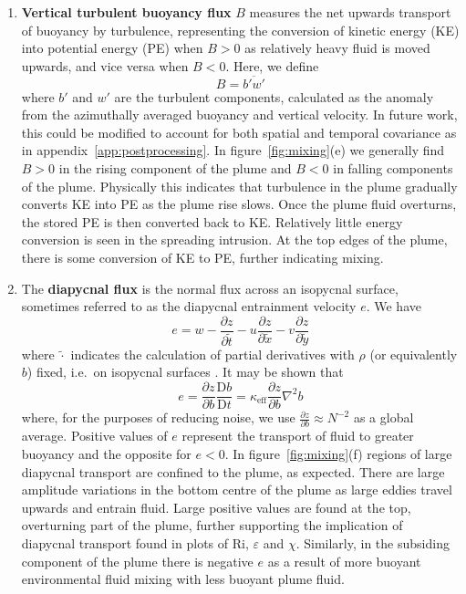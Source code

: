 \documentclass[a4paper]{article}
\begin{document}
\begin{enumerate}[label=(\alph*)]
	\item \textbf{Vertical turbulent buoyancy flux} $B$ measures the net upwards transport of buoyancy by
		turbulence, representing the conversion of kinetic energy (KE) into potential energy (PE) when $B > 0$
		as relatively heavy fluid is moved upwards, and vice versa when $B<0$. Here, we define
		\begin{equation}
			B = \overline{b'w'}
		\end{equation}
		where $b'$ and $w'$ are the turbulent components, calculated as the anomaly from the 
		azimuthally averaged buoyancy and vertical velocity. In future work, this could be modified to account
		for both spatial and temporal covariance as in appendix~\ref{app:postprocessing}. In
		figure~\ref{fig:mixing}(e) we generally find $B > 0$ in the rising component of the plume and $B < 0$ in
		falling components of the plume. Physically this indicates that turbulence in the plume gradually
		converts KE into PE as the plume rise slows.  Once the plume fluid overturns, the stored PE is then
		converted back to KE.  Relatively little energy conversion is seen in the spreading intrusion. At the
		top edges of the plume, there is some conversion of KE to PE, further indicating mixing.

	\item The \textbf{diapycnal flux} is the normal flux across an isopycnal surface, sometimes referred to as
		the diapycnal entrainment velocity $e$. We have
		\begin{equation}
			e = w - \frac{\partial z}{\partial \tilde{t}} - u\frac{\partial z}{\partial\tilde{x}} -
			v\frac{\partial z}{\partial\tilde{y}}
		\end{equation}
		where $\tilde{\cdot}$ indicates the calculation of partial derivatives with $\rho$ (or equivalently $b$)
		fixed, i.e.\ on isopycnal surfaces \citep{deszoeke1993}. It may be shown that
		\begin{equation}
			e = \frac{\partial z}{\partial b}\frac{\mathrm{D}b}{\mathrm{D}t} = \kappa_{\text{eff}} \frac{\partial
				z}{\partial b}\nabla^2 b
		\end{equation}
		where, for the purposes of reducing noise, we use $\frac{\partial z}{\partial b} \approx N^{-2}$ as a
		global average. Positive values of $e$ represent the transport of fluid to greater buoyancy and the
		opposite for $e < 0$. In figure~\ref{fig:mixing}(f) regions of large diapycnal transport are confined
		to the plume, as expected. There are large amplitude variations in the bottom centre of the plume as
		large eddies travel upwards and entrain fluid. Large positive values are found at the top, overturning
		part of the plume, further supporting the implication of diapycnal transport found in plots of
		$\mathrm{Ri}$, $\varepsilon$ and $\chi$. Similarly, in the subsiding component of the plume there is
		negative $e$ as a result of more buoyant environmental fluid mixing with less buoyant plume fluid.

\end{enumerate}
\end{document}
